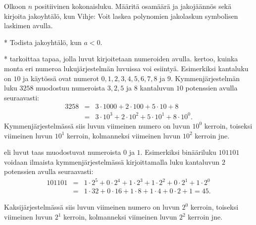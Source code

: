 \begin{kotitehtavasivu}
\begin{tehtava}
	Olkoon $n$ positiivinen kokonaisluku. Määritä osamäärä ja jakojäännös sekä kirjoita jakoyhtälö, kun
	Vihje: Voit laskea polynomien jakolaskun symbolisen laskimen avulla.
\end{tehtava}

\begin{tehtava}
	* Todista jakoyhtälö, kun $a<0$.
\end{tehtava}

\begin{tehtava}
	*  tarkoittaa tapaa, jolla luvut kirjoitetaan numeroiden avulla.  kertoo, kuinka monta eri numeroa lukujärjestelmän luvuissa voi esiintyä. Esimerkiksi  kantaluku on $10$ ja käytössä ovat numerot $0, 1, 2, 3, 4, 5, 6, 7, 8$ ja $9$. Kymmenjärjestelmän luku $3258$ muodostuu numeroista $3, 2, 5$ ja $8$ kantaluvun $10$ potenssien avulla seuraavasti:
	\begin{eqnarray*}
	3258 &=&3\cdot 1000+2\cdot 100+5\cdot 10+8\\
	&=& 3\cdot 10^3+2\cdot 10^2+5\cdot 10^1+8\cdot 10^0.
	\end{eqnarray*}
	Kymmenjärjestelmässä siis luvun viimeinen numero on luvun $10^0$ kerroin, toiseksi viimeinen luvun $10^1$ kerroin, kolmanneksi viimeinen luvun $10^2$ kerroin jne.

	 eli  luvut taas muodostuvat numeroista $0$ ja $1$. Esimerkiksi binääriluku $101101$ voidaan ilmaista kymmenjärjestelmässä kirjoittamalla luku kantaluvun $2$ potenssien avulla seuraavasti:
	\begin{eqnarray*}
	101101&=&1\cdot2^5+0\cdot2^4+1\cdot2^3+1\cdot2^2+0\cdot2^1+1\cdot2^0 \\
	&=& 1\cdot32+0\cdot16+1\cdot8+1\cdot4+0\cdot2+1=45.
	\end{eqnarray*}

	Kaksijärjestelmässä siis luvun viimeinen numero on luvun $2^0$ kerroin, toiseksi viimeinen luvun $2^1$ kerroin, kolmanneksi viimeinen luvun $2^2$ kerroin jne.


\end{tehtava}
\end{kotitehtavasivu}
